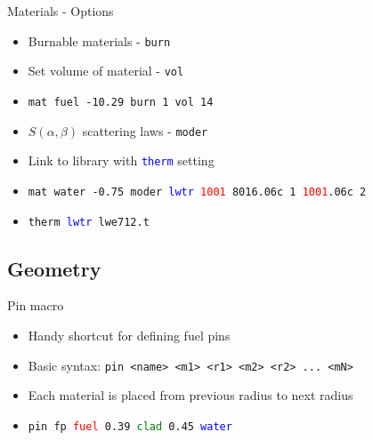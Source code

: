 \documentclass{beamer}
\begin{document}
\begin{frame}{Materials - Options}
    \begin{itemize}
        \item{Burnable materials - \texttt{burn}}
        \item{Set volume of material - \texttt{vol}}
        \item{\texttt{mat fuel -10.29 burn 1 vol 14}}
        \item{$S(\alpha,\beta)$ scattering laws - \texttt{moder}}
        \item{Link to library with \textcolor{blue}{\texttt{therm}} setting}
        \item{\texttt{mat water -0.75 moder \textcolor{blue}{lwtr} \textcolor{red}{1001}
            8016.06c 1 \textcolor{red}{1001}.06c 2}}
        \item{\texttt{therm \textcolor{blue}{lwtr} lwe712.t}}
    \end{itemize}
\end{frame}


\subsection{Geometry}

\begin{frame}{Pin macro}
    \begin{itemize}
        \item{Handy shortcut for defining fuel pins}
        \item{Basic syntax: \texttt{pin <name> <m1> <r1> <m2> <r2> ... <mN>}}
        \item{Each material is placed from previous radius to next radius}
        \item{\texttt{pin fp \textcolor{red}{fuel} 0.39 \textcolor{green}{clad}
               0.45 \textcolor{blue}{water}}}
    \end{itemize}
    \begin{figure}
    \end{figure}
\end{frame}
\end{document}
